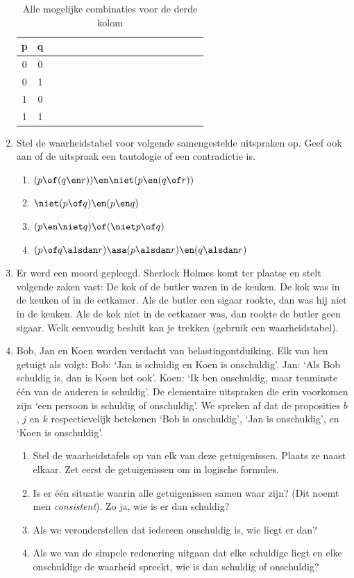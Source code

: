 \begin{enumerate}
\begin{table}[htb]
\begin{tabular}{|c|c|p{0.3cm}|p{0.3cm}|p{0.3cm}|p{0.3cm}|p{0.3cm}|p{0.3cm}|p{0.3cm}|p{0.3cm}|p{0.3cm}|p{0.3cm}|p{0.3cm}|p{0.3cm}|p{0.3cm}|p{0.3cm}|p{0.3cm}|p{0.3cm}|}
\hline
p  & q  & & & & & & & & & & & & & & \\ \hline \hline
0  & 0   & & & & & & & & & & & & & &  \\
0  & 1 & & & & & & & & & & & & & &  \\ 
1  & 0 & & & & & & & & & & & & & &  \\
1  & 1 & & & & & & & & & & & & & &  \\
\hline
\end{tabular}
  \caption{Alle mogelijke combinaties voor de derde kolom}\label{tbl:systematisch}
\end{table}
\item Stel de waarheidstabel voor volgende samengestelde uitspraken op. Geef ook aan of de uitspraak een tautologie of een contradictie is.
\begin{enumerate}
\item $(p \of (q \en r)) \en \niet(p \en (q \of r))$
\item $\niet(p \of q) \en (p \en q)$
\item $(p \en \niet q) \of (\niet p \of q)$
\item $(p \of q \alsdan r) \asa (p\alsdan r) \en (q\alsdan r)$
\end{enumerate}
\item Er werd een moord gepleegd. Sherlock Holmes komt ter plaatse en stelt volgende zaken vast:
De kok of de butler waren in de keuken.
De kok was in de keuken of in de eetkamer.
Als de butler een sigaar rookte, dan was hij niet in de keuken.
Als de kok niet in de eetkamer was, dan rookte de butler geen sigaar.
Welk eenvoudig besluit kan je trekken (gebruik een waarheidstabel).
\item Bob, Jan en Koen worden verdacht van belastingontduiking. Elk van hen getuigt als volgt:
Bob: `Jan is schuldig en Koen is onschuldig'.
Jan: `Als Bob schuldig is, dan is Koen het ook'.
Koen: `Ik ben onschuldig, maar tenminste \'{e}\'{e}n van de anderen is schuldig'.
De elementaire uitspraken die erin voorkomen zijn `een persoon is schuldig of onschuldig'. We spreken af dat de proposities $b$, $j$ en $k$ respectievelijk betekenen `Bob is onschuldig', `Jan is onschuldig', en `Koen is onschuldig'.
\begin{enumerate}
\item Stel de waarheidstafels op van elk van deze getuigenissen. Plaats ze naast elkaar. Zet eerst de getuigenissen om in logische formules.
\item Is er \'{e}\'{e}n situatie waarin alle getuigenissen samen waar zijn? (Dit noemt men \emph{consistent}). Zo ja, wie is er dan schuldig?
\item Als we veronderstellen dat iedereen onschuldig is, wie liegt er dan?
\item Als we van de simpele redenering uitgaan dat elke schuldige liegt en elke onschuldige de waarheid spreekt, wie is dan schuldig of onschuldig?
\end{enumerate}
\end{enumerate}


